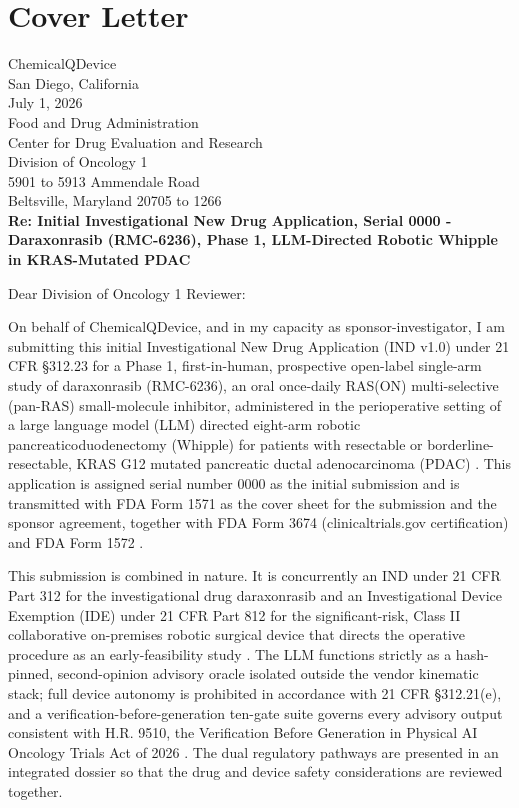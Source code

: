 \section*{Cover Letter}

\noindent ChemicalQDevice \\
San Diego, California \\
July 1, 2026 \\[0.5em]
Food and Drug Administration \\
Center for Drug Evaluation and Research \\
Division of Oncology 1 \\
5901 to 5913 Ammendale Road \\
Beltsville, Maryland 20705 to 1266 \\[0.5em]

\noindent\textbf{Re: Initial Investigational New Drug Application, Serial 0000 - Daraxonrasib (RMC-6236), Phase 1, LLM-Directed Robotic Whipple in KRAS-Mutated PDAC}

\noindent Dear Division of Oncology 1 Reviewer:

On behalf of ChemicalQDevice, and in my capacity as sponsor-investigator, I am submitting this initial Investigational New Drug Application (IND v1.0) under 21 CFR \S 312.23 for a Phase 1, first-in-human, prospective open-label single-arm study of daraxonrasib (RMC-6236), an oral once-daily RAS(ON) multi-selective (pan-RAS) small-molecule inhibitor, administered in the perioperative setting of a large language model (LLM) directed eight-arm robotic pancreaticoduodenectomy (Whipple) for patients with resectable or borderline-resectable, KRAS G12 mutated pancreatic ductal adenocarcinoma (PDAC) \cite{daraxwhipple,onpremwhippl}. This application is assigned serial number 0000 as the initial submission and is transmitted with FDA Form 1571 as the cover sheet for the submission and the sponsor agreement, together with FDA Form 3674 (clinicaltrials.gov certification) and FDA Form 1572 \cite{cfr312paiuni}.

This submission is combined in nature. It is concurrently an IND under 21 CFR Part 312 for the investigational drug daraxonrasib and an Investigational Device Exemption (IDE) under 21 CFR Part 812 for the significant-risk, Class II collaborative on-premises robotic surgical device that directs the operative procedure as an early-feasibility study \cite{onpremwhippl,paiautospons}. The LLM functions strictly as a hash-pinned, second-opinion advisory oracle isolated outside the vendor kinematic stack; full device autonomy is prohibited in accordance with 21 CFR \S 312.21(e), and a verification-before-generation ten-gate suite governs every advisory output consistent with H.R. 9510, the Verification Before Generation in Physical AI Oncology Trials Act of 2026 \cite{congress9510,clintrustpai}. The dual regulatory pathways are presented in an integrated dossier so that the drug and device safety considerations are reviewed together.

